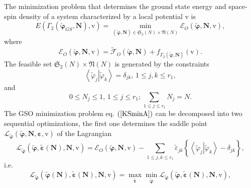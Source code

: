 \documentclass[aps,preprint]{revtex4}%
\begin{document}
The minimization problem that determines the ground state energy and
space-spin density of a system characterized by a local potential $\mathrm{v}$
is
\begin{equation}
E\left(  \Gamma_{2}\left(  \mathbf{\tilde{\varphi}}_{GS}\mathbf{,N}\right)
\mathbf{,}\mathrm{v}\right)  =\min_{\left(  \mathbf{\tilde{\varphi},N}\right)
\mathbf{\in}\mathfrak{S}_{2}\left(  N\right)  \times\mathfrak{N}\left(
N\right)  }\mathcal{E}_{O}\left(  \mathbf{\tilde{\varphi},N,}\mathrm{v}%
\right)  , \label{KSminA}%
\end{equation}
where
\begin{equation}
\mathcal{E}_{O}\left(  \mathbf{\tilde{\varphi},N,}\mathrm{v}\right)
=\mathcal{\tilde{F}}_{O}\left(  \mathbf{\tilde{\varphi},N}\right)
+f_{\Gamma_{2}\left(  \mathbf{\tilde{\varphi},N}\right)  }\left(
\mathrm{v}\right)  .
\end{equation}
The feasible set $\mathfrak{S}_{2}\left(  N\right)  \times\mathfrak{N}\left(
N\right)  $ is generated by the constraints
\begin{equation}
\left\langle \left.  \tilde{\varphi}_{j}\right\vert \tilde{\varphi}%
_{k}\right\rangle =\delta_{jk},\,1\leq j,k\leq r_{1},
\end{equation}
and
\begin{equation}
0\leq N_{j}\leq1,\,1\leq j\leq r_{1};\sum_{\,1\leq j\leq r_{1}}N_{j}=N.
\end{equation}
The GSO minimization problem eq. $\left(  \ref{KSminA}\right)  $ can be
decomposed into two sequential optimizations, the first one determines the
saddle point $\mathcal{L}_{\mathbf{\tilde{\varphi}}}\left(  \mathbf{\tilde
{\varphi},N},\mathbf{\varepsilon},\mathrm{v}\right)  $ of the Lagrangian
\begin{equation}
\mathcal{L}_{\mathbf{\tilde{\varphi}}}\left(  \mathbf{\tilde{\varphi}%
},\mathbf{\tilde{\varepsilon}}\left(  \mathbf{N}\right)  \mathbf{,N,}%
\mathrm{v}\right)  =\mathcal{E}_{O}\left(  \mathbf{\tilde{\varphi}%
,N,}\mathrm{v}\right)  -\sum_{1\leq j,k\leq r_{1}}\tilde{\varepsilon}%
_{jk}\left\{  \overset{}{\left\langle \left.  \tilde{\varphi}_{j}\right\vert
\tilde{\varphi}_{k}\right\rangle -\delta_{jk}}\right\}  ,
\end{equation}
i.e.
\begin{equation}
\mathcal{L}_{\mathbf{\tilde{\varphi}}}\left(  \mathbf{\tilde{\varphi}}\left(
\mathbf{N}\right)  ,\mathbf{\tilde{\varepsilon}}\left(  \mathbf{N}\right)
,\mathbf{N,}\mathrm{v}\right)  =\max_{\mathbf{\tilde{\varepsilon}}}%
\min_{\mathbf{\tilde{\varphi}}}\mathcal{L}_{\mathbf{\tilde{\varphi}}}\left(
\mathbf{\tilde{\varphi}},\mathbf{\tilde{\varepsilon}}\left(  \mathbf{N}%
\right)  \mathbf{,N,}\mathrm{v}\right)  , \label{KSM1A}%
\end{equation}
\end{document}
